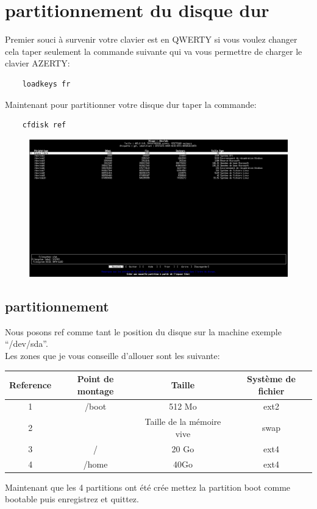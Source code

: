 \documentclass[a4paper]{book}
\begin{document}
  \chapter{partitionnement  du disque dur}
  Premier souci à survenir votre clavier est en QWERTY si vous voulez changer
  cela taper seulement la commande suivante qui va vous permettre de charger le
  clavier AZERTY:\\
  \begin{lstlisting}
    loadkeys fr
  \end{lstlisting}
  Maintenant pour partitionner votre disque dur taper la commande:\\
  \begin{lstlisting}
    cfdisk ref
  \end{lstlisting}
  \begin{figure}[h]
    \includegraphics[width=\textwidth]{images/cfdisk}
  \end{figure}
  \pagebreak

  \section{partitionnement}
  Nous posons ref comme tant le position du disque sur la machine exemple
  ``/dev/sda''.\\
  Les zones que je vous conseille d'allouer sont les suivante:\\
  \begin{tabular*}{\textwidth}{|c|c|c|c}
    Reference & Point de montage & Taille & Système de fichier\\
    \hline
    1 & /boot & 512 Mo & ext2 \\
    \hline
    2 & & Taille de la mémoire vive & swap \\
    \hline
    3 & / & 20 Go & ext4\\
    \hline
    4 & /home & 40Go & ext4
  \end{tabular*}
  \newline
  Maintenant que les 4 partitions ont été crée mettez la partition boot comme
  bootable puis enregistrez et quittez.
\end{document}

